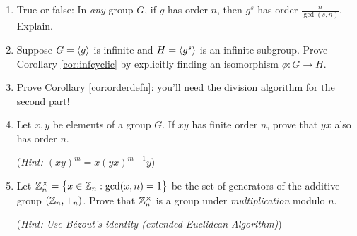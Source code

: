 \begin{exercises}
\begin{enumerate}
	  
	  \item True or false: In \emph{any} group $G$, if $g$ has order $n$, then $g^s$ has order $\frac n{\gcd(s,n)}$. Explain.
	  
	  
	  \item Suppose $G=\left\langle g\right\rangle$ is infinite and $H=\left\langle g^s\right\rangle$ is an infinite subgroup. Prove Corollary \ref{cor:infcyclic} by explicitly finding an isomorphism $\phi:G\to H$.
	
	
	  \item Prove Corollary \ref{cor:orderdefn}: you'll need the division algorithm for the second part!
	  
	  
		\item Let $x,y$ be elements of a group $G$. If $xy$ has finite order $n$, prove that $yx$ also has order $n$.\par
		(\emph{Hint: $(xy)^m=x(yx)^{m-1}y$})
		
		
		\item\label{exs:znmult} Let $\mathbb{Z}_n^\times=\bigl\{x\in\mathbb{Z}_n:\gcd(x,n)=1\bigr\}$ be the set of generators of the additive group $(\mathbb{Z}_n,+_n)$. Prove that $\mathbb{Z}_n^\times$ is a group under \emph{multiplication} modulo $n$.\par
		(\emph{Hint: Use Bézout's identity (extended Euclidean Algorithm)})
		
		

\end{enumerate}
\end{exercises}
